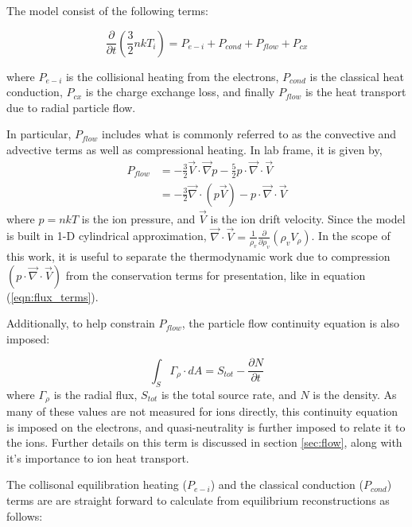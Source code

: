 \documentclass[aip, pop, preprint]{revtex4-1}
\begin{document}
The model consist of the following terms:

\begin{equation}\label{eqn:balance}
\frac{\partial}{\partial t}\left(\frac{3}{2}nkT_{i}\right) = P_{e-i} + P_{cond} + P_{flow} + P_{cx} %
\end{equation}

where $P_{e-i}$ is the collisional heating from the electrons, $P_{cond}$ is the classical heat conduction, $P_{cx}$ is the charge exchange loss, and finally $P_{flow}$ is the heat transport due to radial particle flow. 

In particular, $P_{flow}$ includes what is commonly referred to as the convective and advective terms as well as compressional heating. In lab frame, it is given by,
\begin{align}
P_{flow} & = -\frac{3}{2}\vec{V}\cdot\vec{\nabla}p - \frac{5}{2}p\cdot\vec{\nabla}\cdot\vec{V}\\
& = -\frac{3}{2}\vec{\nabla}\cdot(p\vec{V}) - p\cdot\vec{\nabla}\cdot\vec{V}\label{eqn:flux_terms}
\end{align} 
where $p = nkT$ is the ion pressure, and $\vec{V}$ is the ion drift velocity. Since the model is built in 1-D cylindrical approximation, $\vec{\nabla}\cdot\vec{V} = \frac{1}{\rho_v}\frac{\partial}{\partial\rho_v}(\rho_v V_{\rho})$. In the scope of this work, it is useful to separate the thermodynamic work due to compression $  ( p\cdot\vec{\nabla}\cdot\vec{V} )
$ from the conservation terms for presentation, like in equation
(\ref{eqn:flux_terms}). 

Additionally, to help constrain $P_{flow}$, the particle flow continuity equation is also imposed:

\begin{equation}\label{eqn:cont}
\int_{S} \Gamma_{\rho}\cdot dA = S_{tot}-\frac{\partial N}{\partial t}
\end{equation}
where $\Gamma_{\rho}$ is the radial flux, $S_{tot}$ is the total source rate, and $N$ is the density. As many of these values are not measured for ions directly, this continuity equation is imposed on the electrons, and quasi-neutrality is further imposed to relate it to the ions. Further details on this term is discussed in section \ref{sec:flow}, along with it's importance to ion heat transport. 


The collisonal equilibration heating ($P_{e-i}$) and the classical conduction ($P_{cond}$) terms are
are straight forward to calculate from equilibrium reconstructions as follows\cite{Huba2016NRLFORMULARY,Braginskii1965TransportPlasma}:
\end{document}
